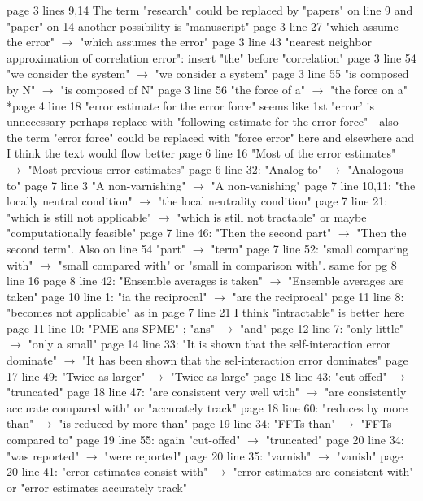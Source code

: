 \documentclass[a4paper]{article}
\begin{document}
page 3 lines 9,14  The term "research" could be replaced by "papers" on line 9 and "paper" on 14
another possibility is "manuscript"
page 3 line 27 "which assume the error" $\rightarrow$ "which assumes the error"
page 3 line 43 "nearest neighbor approximation of correlation error": insert "the" before "correlation"
page 3 line 54 "we consider the system" $\rightarrow$ "we consider a system"
page 3 line 55 "is composed by N" $\rightarrow$ "is composed of N"
page 3 line 56 "the force of a" $\rightarrow$ "the force on a"
*page 4 line 18 "error estimate for the error force" seems like 1st "error' is unnecessary
              perhaps replace with "following estimate for the error force"---also the term "error force" could be
              replaced with "force error" here and elsewhere and I think the text would flow better
page 6 line 16 "Most of the error estimates" $\rightarrow$ "Most previous error estimates"
page 6 line 32: "Analog to" $\rightarrow$ "Analogous to"
page 7 line 3 "A non-varnishing" $\rightarrow$ "A non-vanishing"
page 7 line 10,11: "the locally neutral condition" $\rightarrow$ "the local neutrality condition"
page 7 line 21: "which is still not applicable" $\rightarrow$ "which is still not tractable" or maybe "computationally feasible"
page 7 line 46: "Then the second part" $\rightarrow$ "Then the second term". Also on line 54 "part" $\rightarrow$ "term"
page 7 line 52: "small comparing with" $\rightarrow$ "small compared with" or "small in comparison with". same for pg 8 line 16
page 8 line 42: "Ensemble averages is taken" $\rightarrow$ "Ensemble averages are taken"
page 10 line 1: "ia the reciprocal" $\rightarrow$ "are the reciprocal"
page 11 line 8: "becomes not applicable" as in page 7 line 21 I think "intractable" is better here
page 11 line 10: "PME ans SPME" ; "ans" $\rightarrow$ "and"
page 12 line 7: "only little" $\rightarrow$ "only a small"
page 14 line 33: "It is shown that the self-interaction error dominate" $\rightarrow$ "It has been shown that the sel-interaction
                   error dominates"
page 17 line 49: "Twice as larger" $\rightarrow$ "Twice as large"
page 18 line 43: "cut-offed" $\rightarrow$ "truncated"
page 18 line 47: "are consistent very well with" $\rightarrow$ "are consistently accurate compared with" or "accurately track"
page 18 line 60: "reduces by more than" $\rightarrow$ "is reduced by more than"
page 19 line 34: "FFTs than" $\rightarrow$ "FFTs compared to"
page 19 line 55: again "cut-offed" $\rightarrow$ "truncated"
page 20 line 34: "was reported" $\rightarrow$ "were reported"
page 20 line 35: "varnish" $\rightarrow$ "vanish"
page 20 line 41: "error estimates consist with" $\rightarrow$ "error estimates are consistent with" or
                                                  "error estimates accurately track"
\end{document}
